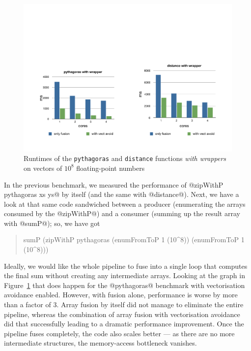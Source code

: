 \begin{figure}
\includegraphics[scale=0.6, trim=0cm 2cm 0cm 8cm, clip]{data/DistPythagorasInl.pdf}
\caption{Runtimes of the \texttt{pythagoras} and \texttt{distance} functions \emph{with wrappers} on vectors of $10^8$ floating-point numbers}
\label{Figure:distancePythagorasInl}
\end{figure}
%
In the previous benchmark, we measured the performance of @zipWithP pythagoras xs ys@ by itself (and the same with @distance@). Next, we have a look at that same code sandwiched between a producer (enumerating the arrays consumed by the @zipWithP@) and a consumer (summing up the result array with @sumP@); so, we have got
%
\begin{quote}\small
\begin{code}
sumP (zipWithP pythagoras 
               (enumFromToP 1 (10^8)) 
               (enumFromToP 1 (10^8)))
\end{code}
\end{quote}
%
Ideally, we would like the whole pipeline to fuse into a single loop that computes the final sum without creating any intermediate arrays. Looking at the graph in Figure~\ref{Figure:distancePythagorasInl} that does happen for the @pythagoras@ benchmark with vectorisation avoidance enabled. However, with fusion alone, performance is worse by more than a factor of 3. Array fusion by itself did not manage to eliminate the entire pipeline, whereas the combination of array fusion with vectorisation avoidance did that successfully leading to a dramatic performance improvement. Once the pipeline fuses completely, the code also scales better --- as there are no more intermediate structures, the memory-access bottleneck vanishes.

